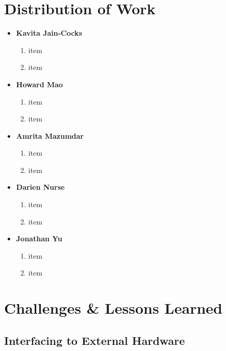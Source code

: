 \documentclass{article}
\begin{document}
\section{Distribution of Work}
	\begin{itemize}
	
	\item
	\textbf{Kavita Jain-Cocks}
		\begin{enumerate}
		\item item
		\item item
		\end{enumerate}
	
	\item 
	\textbf{Howard Mao}
		\begin{enumerate}
		\item item
		\item item
		\end{enumerate}
	
	\item 
	\textbf{Amrita Mazumdar}
		\begin{enumerate}
		\item item
		\item item
		\end{enumerate}
	
	\item 
	\textbf{Darien Nurse}
		\begin{enumerate}
		\item item
		\item item
		\end{enumerate}
	
	\item 
	\textbf{Jonathan Yu}
		\begin{enumerate}
		\item item
		\item item
		\end{enumerate}
	
	\end{itemize}

\section{Challenges \& Lessons Learned}

\subsection{Interfacing to External Hardware}
\end{document}
